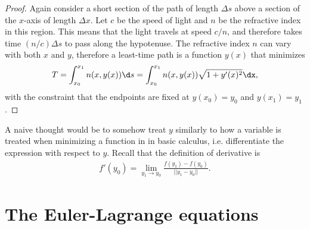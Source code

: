 \begin{proof}
  Again consider a short section of the path of length $\Delta s$ above a section of the $x$-axis of
  length $\Delta x$. Let $c$ be the speed of light and $n$ be the refractive index in this
  region. This means that the light travels at speed $c/n$, and therefore takes time $(n/c)\Delta s$
  to pass along the hypotenuse. The refractive index $n$ can vary with both $x$ and $y$, therefore a
  least-time path is a function $y(x)$ that minimizes
  \begin{align*}
    T = \int_{x_0}^{x_1} n(x, y(x)) \d s = \int_{x_0}^{x_1} n(x, y(x)) \sqrt{1 + y'(x)^2} \dx,
  \end{align*}
  with the constraint that the endpoints are fixed at $y(x_0) = y_0$ and $y(x_1) = y_1$.

\end{proof}

A naive thought would be to somehow treat $y$ similarly to how a variable is treated when minimizing
a function in in basic calculus, i.e. differentiate the expression with respect to $y$. Recall that
the definition of derivative is
\begin{align*}
  f'(y_0) = \lim_{y_1 \to y_0}\frac{f(y_1) - f(y_0)}{||y_1 - y_0||}.
\end{align*}


\section{The Euler-Lagrange equations}

